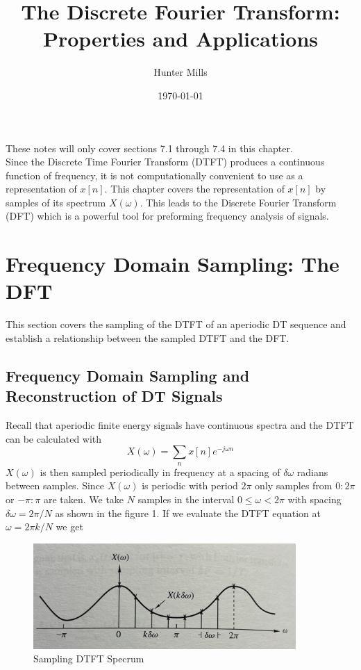 \documentclass{article} %
\title{The Discrete Fourier Transform: Properties and Applications} %
\author{Hunter Mills} %
\date{\today} %
\begin{document}
    \maketitle %
    These notes will only cover sections 7.1 through 7.4 in this chapter.\\
    
    Since the Discrete Time Fourier Transform (DTFT) produces a continuous function of frequency, it is not computationally convenient to use as a representation of $x[n]$. This chapter covers the representation of $x[n]$ by samples of its spectrum $X(\omega)$. This leads to the Discrete Fourier Transform (DFT) which is a powerful tool for preforming frequency analysis of signals.
    
    \section{Frequency Domain Sampling: The DFT} %
	This section covers the sampling of the DTFT of an aperiodic DT sequence and establish a relationship between the sampled DTFT and the DFT.
    
    \subsection{Frequency Domain Sampling and Reconstruction of DT Signals}
    Recall that aperiodic finite energy signals have continuous spectra and the DTFT can be calculated with
    \begin{equation}
	X(\omega) = \sum_n x[n]e^{-j\omega n}
	\end{equation}
	$X(\omega)$ is then sampled periodically in frequency at a spacing of $\delta \omega$ radians between samples. Since $X(\omega)$ is periodic with period $2\pi$ only samples from $0:2\pi$ or $-\pi:\pi$ are taken. We take $N$ samples in the interval $0 \le \omega < 2\pi$ with spacing $\delta \omega = 2\pi /N$ as shown in the figure 1. If we evaluate the DTFT equation at $\omega = 2\pi k/N$ we get
	
	\begin{figure}[h]
	\centering
	\includegraphics[width=10cm]{dft_s}
	\caption{Sampling DTFT Specrum}
	\end{figure}
	
\end{document}
